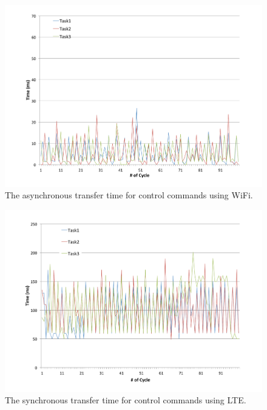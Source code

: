 \begin{figure}[!t]
 \centering
 \includegraphics[width=\hsize]{fig/No4_Andrive_serv_cycle_WiFi_only_send.pdf}
 \caption{The asynchronous transfer time for control commands using WiFi.}
 \label{fig:no4}
\end{figure}

\begin{figure}[!t]
 \centering
 \includegraphics[width=\hsize]{fig/No2_Andrive_serv_cycle_LTE.pdf}
 \caption{The synchronous transfer time for control commands using LTE.}
 \label{fig:no2}
\end{figure}

